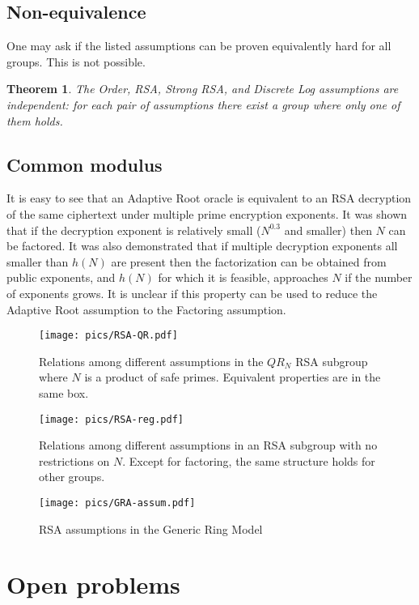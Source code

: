 \documentclass[a4paper]{article}
\newtheorem{theorem}{Theorem}
\begin{document}
\subsection{Non-equivalence}

One may ask if the listed assumptions can be proven equivalently hard for all groups. This is not possible.
\begin{theorem}\cite{LM71,DBLP:conf/tcc/Rivest04} The Order, RSA, Strong RSA, and Discrete Log assumptions are independent: for each pair of assumptions there exist a group where only one of them holds.
\end{theorem}

\subsection{Common modulus}
It is easy to see that an Adaptive Root oracle is equivalent to an RSA decryption of the same ciphertext under multiple prime encryption exponents. It was shown that if the decryption exponent is relatively small ($N^{0.3}$ and smaller) then $N$ can be factored. It was also demonstrated that if multiple decryption exponents all smaller than $h(N)$ are present then the factorization can be obtained from public exponents, and $h(N)$ for which it is feasible, approaches $N$ if the number of exponents grows. It is unclear if this property can be used to reduce the Adaptive Root assumption to the Factoring assumption.


\begin{figure}
    \centering
    \texttt{[image: pics/RSA-QR.pdf]}
    \caption{Relations among different assumptions in the $QR_N$ RSA subgroup where $N$ is a product of safe primes. Equivalent properties are in the same box.}
    \label{fig:rsa}
\end{figure}

\begin{figure}
    \centering
    \texttt{[image: pics/RSA-reg.pdf]}
    \caption{Relations among different assumptions in an RSA subgroup with no restrictions on $N$. Except for factoring, the same structure holds for other groups.}
    \label{fig:rsa}
\end{figure}

\begin{figure}
    \centering
    \texttt{[image: pics/GRA-assum.pdf]}
    \caption{RSA assumptions in the Generic Ring Model}
    \label{fig:gra}
\end{figure}
\section{Open problems}
\end{document}

